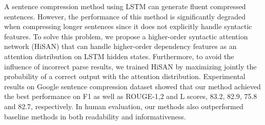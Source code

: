 A sentence compression method using LSTM can generate fluent compressed sentences. However, the performance of this method is significantly degraded when compressing longer sentences since it does not explicitly handle syntactic features. To solve this problem, we propose a higher-order syntactic attention network (HiSAN) that can handle higher-order dependency features as an attention distribution on LSTM hidden states. Furthermore, to avoid the influence of incorrect parse results, we trained HiSAN by maximizing jointly the probability of a correct output with the attention distribution. Experimental results on Google sentence compression dataset showed that our method achieved the best performance on F1 as well as ROUGE-1,2 and L scores, 83.2, 82.9, 75.8 and 82.7, respectively. In human evaluation, our methods also outperformed baseline methods in both readability and informativeness.
